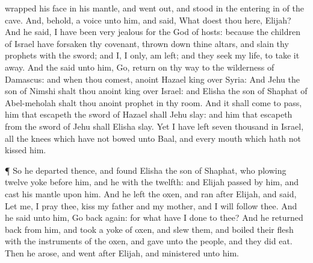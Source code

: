 {wrapped his
face in his
mantle, and went
out, and
stood in the entering
in of the
cave. And, behold,
{} a
voice unto him, and
said, What doest thou here,
Elijah?
And he
said, I have been
very
jealous for the
{}
God of
hosts: because the
children of
Israel have
forsaken thy
covenant, thrown
down thine
altars, and
slain thy
prophets with the
sword; and I,
{} I only, am
left; and they
seek my
life, to take it
away.
And the
{}
said unto him,
Go,
return on thy
way to the
wilderness of
Damascus: and when thou
comest,
anoint
Hazael
{}
king over
Syria:
And
Jehu the
son of
Nimshi shalt thou
anoint
{}
king over
Israel: and
Elisha the
son of
Shaphat of
Abel-meholah shalt thou
anoint
{}
prophet in thy room.
And it shall come to pass,
{} him that
escapeth the
sword of
Hazael shall
Jehu
slay: and him that
escapeth from the
sword of
Jehu shall
Elisha
slay.
Yet I have
left
{}
seven
thousand in
Israel, all the
knees which have not
bowed unto
Baal, and every
mouth which hath not
kissed him.
\par }{\PP {}¶ So he
departed thence, and
found
Elisha the
son of
Shaphat, who
{}
plowing
{}
twelve
yoke
{}
before him, and he with the
twelfth: and
Elijah
passed by him, and
cast his
mantle upon him.
And he
left the
oxen, and
ran
after
Elijah, and
said, Let me, I pray thee,
kiss my
father and my
mother, and
{} I will
follow thee. And he
said unto him, Go
back
again: for what have I
done to thee?
And he returned
back from
him, and
took a
yoke of
oxen, and
slew them, and
boiled their
flesh with the
instruments of the
oxen, and
gave unto the
people, and they did
eat. Then he
arose, and
went
after
Elijah, and
ministered unto him.

}
